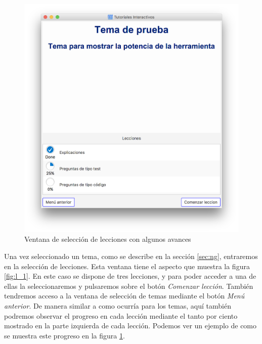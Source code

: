 \documentclass[]{article}
\begin{document}
\begin{figure}[tbp]
\begin{center}
\includegraphics[scale=0.35,trim={50px 50px 50px 30px},clip]{l_2.png}
\end{center}
\caption{Ventana de selección de lecciones con algunos avances\label{fig:l_2}}
\end{figure}
%

Una vez seleccionado un tema, como se describe en la sección \ref{sec:ng}, entraremos en la selección de lecciones. Esta ventana tiene el aspecto que muestra la figura \ref{fig:l_1}. En este caso se dispone de tres lecciones, y para poder acceder a una de ellas la seleccionaremos y pulsaremos sobre el botón \emph{Comenzar lección}. También tendremos acceso a la ventana de selección de temas mediante el botón \emph{Menú anterior}. De manera similar a como ocurría para los temas, aquí también podremos observar el progreso en cada lección mediante el tanto por ciento mostrado en la parte izquierda de cada lección. Podemos ver un ejemplo de como se muestra este progreso en la figura \ref{fig:l_2}.
\end{document}
